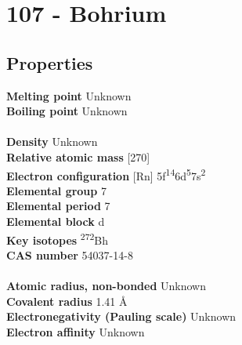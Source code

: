 \section{107 - Bohrium}
\label{sec:elem-bohrium}
\subsection{Properties}
\textbf{Melting point} Unknown\\
\textbf{Boiling point} Unknown\\
\\
\textbf{Density} Unknown\\
\textbf{Relative atomic mass} [270]\\
\textbf{Electron configuration} [Rn] 5f\textsuperscript{14}6d\textsuperscript{5}7s\textsuperscript{2}\\
\textbf{Elemental group} 7\\
\textbf{Elemental period} 7\\
\textbf{Elemental block} d\\
\textbf{Key isotopes} \textsuperscript{272}Bh\\
\textbf{CAS number} 54037-14-8\\
\\
\textbf{Atomic radius, non-bonded} Unknown\\
\textbf{Covalent radius} 1.41 Å\\
\textbf{Electronegativity (Pauling scale)} Unknown\\
\textbf{Electron affinity} Unknown\\